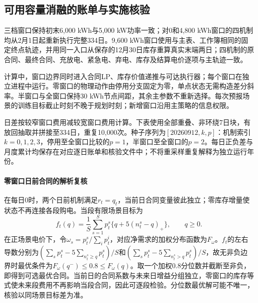 \subsection{可用容量消融的账单与实施核验}\label{app:capacity}
三档窗口保持初末6,000 kWh与5,000 kW功率一致；对0和4,800 kWh窗口的四机制均从2月1日起重新执行完整334日。9,600 kWh窗口使用与主表、工作簿相同的固定终点轨迹，并用同一入口从保存的12月30日库存重算真实末端两日；四机制的原合同、最终合同、充放电、紧急电、弃电、库存及结算电价逐项与主轨迹一致。

计算中，窗口边界同时进入合同LP、库存价值递推与可达执行器；每个窗口在独立进程中运行。零窗口的物理动作由停用分支固定为零，单点状态无需构造差分斜率。半窗口与全窗口保持30 kWh节点间距，其余主参数不重新选择。每次预报场景的训练目标截止时刻不晚于规划时刻；新增窗口沿用主策略的信息权限。


日差按较窄窗口费用减较宽窗口费用计算。下表使用全部重叠、非环绕7日块，有放回抽取并拼接至334日，重复10,000次。种子序列为$[20260912,k,p]$：机制索引$k=0,1,2,3$，停用至全窗口比较的$p=1$，半窗口至全窗口的$p=2$。每日正负差与月度累计均保存在对应逐日账单和核验文件中；不将重采样重复解释为独立运行年份。



\paragraph{零窗口日前合同的解析复核}
在每日0时，两个日前机制满足$r_t=q_t$，当前日合同变量彼此独立；零库存增量使状态不再连接各段购电。当段有限场景目标为
\begin{equation}\label{eq:zeroquantile}
 f_t(q)=\frac1S\sum_{s=1}^S p_t^s\{q+5(n_t^s-q)_+\},\qquad q\ge0.
\end{equation}
在正场景电价下，令$\omega_s=p_t^s/\sum_i p_t^i$，对应净需求的加权分布函数为$F_\omega$。$f_t$的左右导数分别为$(\sum_s p_t^s-5\sum_{n_t^s\ge q}p_t^s)/S$和$(\sum_s p_t^s-5\sum_{n_t^s>q}p_t^s)/S$，故无非负边界时最优条件为$F_\omega(q^-)\le0.8\le F_\omega(q)$。取一个加权0.8分位数并截断至非负，即得到可选最优合同。当前日的合同系数与未来日增益分组独立，零窗口的库存等式使未来段费用不再影响当段合同，因此可逐段检验。分位数最优解可能不唯一，核验以同场景目标差为准。

